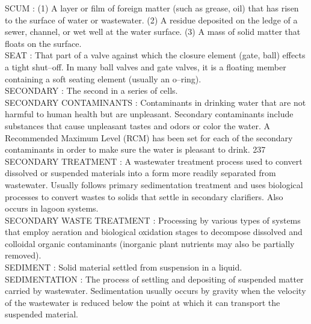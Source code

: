 \vspace{0.15cm}
SCUM :  (1) A layer or film of foreign matter (such as grease, oil) that has risen to the surface of water or wastewater. (2) A residue deposited on the ledge of a sewer, channel, or wet well at the water surface. (3) A mass of solid matter that floats on the surface. \\
\vspace{0.15cm}
SEAT :   That part of a valve against which the closure element (gate, ball) effects a tight shut–off. In many ball valves and gate valves, it is a floating member containing a soft seating element (usually an o–ring).\\
\vspace{0.15cm}
SECONDARY :  The second in a series of cells.\\
\vspace{0.15cm}
SECONDARY CONTAMINANTS :  Contaminants in drinking water that are not harmful to human health but are unpleasant. Secondary contaminants include substances that cause unpleasant tastes and odors or color the water. A Recommended Maximum Level (RCM) has been set for each of the secondary contaminants in order to make sure the water is pleasant to drink. 237 \\
\vspace{0.15cm}
SECONDARY TREATMENT :  A wastewater treatment process used to convert dissolved or suspended materials into a form more readily separated from wastewater. Usually follows primary sedimentation treatment and uses biological processes to convert wastes to solids that settle in secondary clarifiers. Also occurs in lagoon systems.\\
\vspace{0.15cm}
SECONDARY WASTE TREATMENT :   Processing by various types of systems that employ aeration and biological oxidation stages to decompose dissolved and colloidal organic contaminants (inorganic plant nutrients may also be partially removed).\\
\vspace{0.15cm}
SEDIMENT :  Solid material settled from suspension in a liquid. \\
\vspace{0.15cm}
SEDIMENTATION :  The process of settling and depositing of suspended matter carried by wastewater. Sedimentation usually occurs by gravity when the velocity of the wastewater is reduced below the point at which it can transport the suspended material. \\
\vspace{0.15cm}
